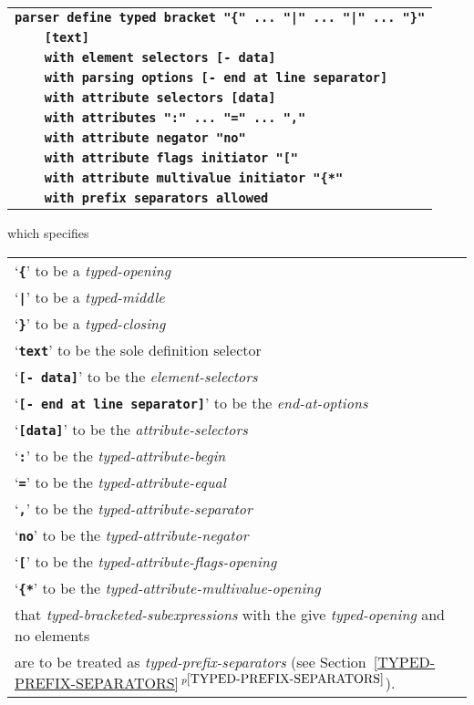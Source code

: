 \documentclass[12pt]{article}
\newcommand{\TT}[1]{{\tt \bfseries #1}}
\newcommand{\itemref}[1]{\ref{#1}$\,^{p\pageref{#1}}$}
\begin{document}
\begin{center}
\begin{tabular}{l}
\TT{parser define typed bracket "\{"~...~"|"~...~"|"~...~"\}"} \\
\TT{~~~~[text]~} \\
\TT{~~~~with element selectors [- data]} \\
\TT{~~~~with parsing options [- end at line separator]} \\
\TT{~~~~with attribute selectors [data]} \\
\TT{~~~~with attributes ":"~...~"="~...~","} \\
\TT{~~~~with attribute negator "no"} \\
\TT{~~~~with attribute flags initiator "["} \\
\TT{~~~~with attribute multivalue initiator "\{*"} \\
\TT{~~~~with prefix separators allowed} \\
\end{tabular}
\end{center}
which specifies
\begin{center}
\begin{tabular}{l}
`\TT{\{}' to be a {\em typed-opening} \\
`\TT{|}' to be a {\em typed-middle} \\
`\TT{\}}' to be a {\em typed-closing} \\
`\TT{text}' to be the sole definition selector \\
`\TT{[- data]}' to be the {\em element-selectors} \\
`\TT{[- end at line separator]}' to be the {\em end-at-options} \\
`\TT{[data]}' to be the {\em attribute-selectors} \\
`\TT{:}' to be the {\em typed-attribute-begin} \\
`\TT{=}' to be the {\em typed-attribute-equal} \\
`\TT{,}' to be the {\em typed-attribute-separator} \\
`\TT{no}' to be the {\em typed-attribute-negator} \\
`\TT{[}' to be the {\em typed-attribute-flags-opening} \\
`\TT{\{*}' to be the {\em typed-attribute-multivalue-opening} \\
that {\em typed-bracketed-subexpressions} with the give {\em typed-opening}
and no elements \\
are to be treated as {\em typed-prefix-separators}
(see Section~\itemref{TYPED-PREFIX-SEPARATORS}).
\end{tabular}
\end{center}
\end{document}
